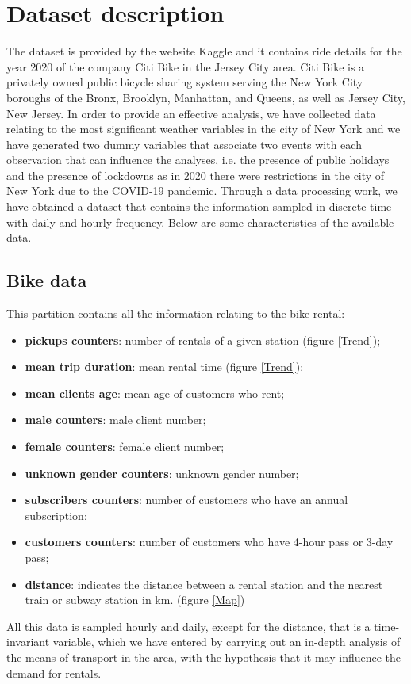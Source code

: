 \section{Dataset description}
The dataset is provided by the website Kaggle and it contains ride details for the year \num{2020} of the company Citi Bike in the Jersey City area. Citi Bike is a privately owned public bicycle sharing system serving the New York City boroughs of the Bronx, Brooklyn, Manhattan, and Queens, as well as Jersey City, New Jersey. In order to provide an effective analysis, we have collected data relating to the most significant weather variables in the city of New York and we have generated two dummy variables that associate two events with each observation that can influence the analyses, i.e. the presence of public holidays and the presence of lockdowns as in \num{2020} there were restrictions in the city of New York due to the COVID-\num{19} pandemic.
Through a data processing work, we have obtained a dataset that contains the information sampled in discrete time with daily and hourly frequency. Below are some characteristics of the available data.

\subsection{Bike data}
This partition contains all the information relating to the bike rental:
\begin{itemize}
	\item \textbf{pickups counters}: number of rentals of a given station (figure \ref{Trend});
	\item \textbf{mean trip duration}: mean rental time (figure \ref{Trend});
	\item \textbf{mean clients age}: mean age of customers who rent;
	\item \textbf{male counters}: male client number;
	\item \textbf{female counters}: female client number;
	\item \textbf{unknown gender counters}: unknown gender number;
	\item \textbf{subscribers counters}: number of customers who have an annual subscription;
	\item \textbf{customers counters}: number of customers who have \num{4}-hour pass or \num{3}-day pass;
	\item \textbf{distance}: indicates the distance between a rental station and the nearest train or subway station in \unit{\kilo\meter}. (figure \ref{Map})
	
\end{itemize}
All this data is sampled hourly and daily, except for the distance, that is a time-invariant variable, which we have entered by carrying out an in-depth analysis of the means of transport in the area, with the hypothesis that it may influence the demand for rentals.

